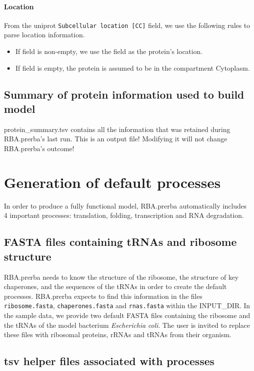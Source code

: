 \paragraph{Location}
From the uniprot \texttt{Subcellular location [CC]} field,
we use the following rules to parse location information.
\begin{itemize}
\item If field is non-empty, we use the field as the protein's location.
\item If field is empty, the protein is assumed to be in the compartment Cytoplasm.
\end{itemize}

\subsection{Summary of protein information used to build model}

protein\_summary.tsv contains all the information that was retained during RBA.prerba's last run.
This is an output file! Modifying it will not change RBA.prerba's outcome!

\section{Generation of default processes}

In order to produce a fully functional model,
RBA.prerba automatically includes 4 important processes:
translation, folding, transcription and RNA degradation.

\subsection{FASTA files containing tRNAs and ribosome structure}
RBA.prerba needs to know the structure of the ribosome,
the structure of key chaperones, and the sequences of the
tRNAs in order to create the default processes.
RBA.prerba expects to find this information in the files
\texttt{ribosome.fasta}, \texttt{chaperones.fasta} and \texttt{rnas.fasta} within the INPUT\_DIR.
In the sample data, we provide two default FASTA files containing the ribosome
and the tRNAs of the model bacterium \textit{Escherichia coli}.
The user is invited to replace these files with ribosomal proteins, rRNAs and tRNAs from
their organism.

\subsection{tsv helper files associated with processes}

